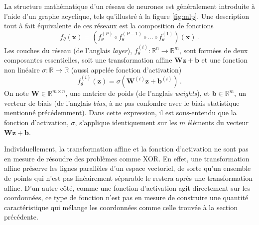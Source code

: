 La structure mathématique d'un réseau de neurones est généralement introduite à l'aide d'un graphe acyclique, 
tels qu'illustré à la figure \ref{fig:mlp}. Une description tout à fait équivalente de ces réseaux est la  
composition de fonctions
\begin{equation}\label{eq:composition}
        f_\theta(\mathbf{x}) = (f^{(P)}_\theta \circ f^{(P-1)}_\theta \circ \dots \circ f^{(1)}_\theta)(\mathbf{x})\, .
\end{equation} 
Les couches du réseau (de l'anglais \textit{layer}), $f_\theta^{(i)}: \mathbb{R}^{n} \rightarrow \mathbb{R}^{m}$, sont formées de deux composantes essentielles, 
soit une transformation affine $\mathbf{W}\mathbf{z} + \mathbf{b}$ et une fonction non linéaire $\sigma: \mathbb{R} \rightarrow  \mathbb{R}$ 
(aussi appelée fonction d'activation)
\begin{equation}\label{eq:mlp layer}
        f^{(i)}_\theta(\mathbf{z}) = \sigma( \mathbf{W}^{(i)} \mathbf{z} + \mathbf{b}^{(i)})\, .
\end{equation} 
On note $\mathbf{W} \in \mathbb{R}^{m \times n}$, une matrice de poids (de l'anglais \textit{weights}), et 
$\mathbf{b} \in \mathbb{R}^{m}$, un vecteur de biais (de l'anglais \textit{bias}, à ne pas confondre avec le biais statistique mentionné précédemment). 
Dans cette expression, il est sous-entendu que la fonction 
d'activation, $\sigma$, s'applique identiquement sur les $m$ éléments du vecteur $\mathbf{W} \mathbf{z} + \mathbf{b}$. 

Individuellement, 
la transformation affine et la fonction d'activation ne sont pas en mesure de résoudre des problèmes comme XOR. En effet, 
une transformation affine préserve les lignes parallèles d'un espace vectoriel, de sorte 
qu'un ensemble de points qui n'est pas linéairement séparable le restera après une transformation affine. 
D'un autre côté, comme une fonction d'activation agit directement sur les coordonnées, ce type de fonction n'est 
pas en mesure de construire une quantité caractéristique qui mélange les coordonnées 
comme celle trouvée à la section précédente. 

